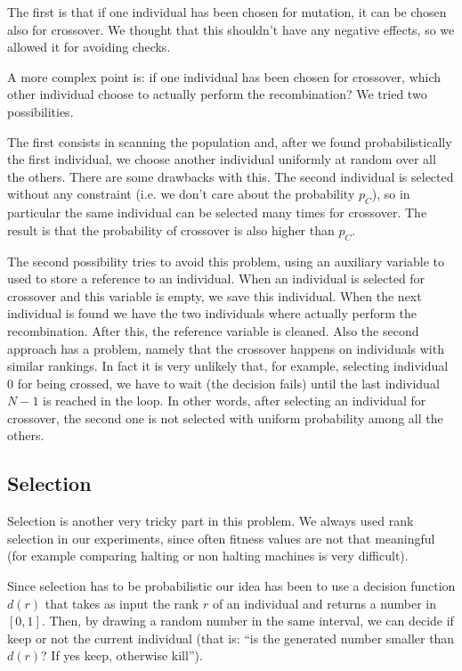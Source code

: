 \documentclass{report}
\begin{document}
The first is that if one individual has been chosen for mutation, it can be chosen also for crossover. We thought that this shouldn't have any negative effects, so we allowed it for avoiding checks.

A more complex point is: if one individual has been chosen for crossover, which other individual choose to actually perform the recombination? We tried two possibilities.

The first consists in scanning the population and, after we found probabilistically the first individual, we choose another individual uniformly at random over all the others. There are some drawbacks with this. The second individual is selected without any constraint (i.e. we don't care about the probability $p_C$), so in particular the same individual can be selected many times for crossover. The result is that the probability of crossover is also higher than $p_C$.

The second possibility tries to avoid this problem, using an auxiliary variable to used to store a reference to an individual. When an individual is selected for crossover and this variable is empty, we save this individual. When the next individual is found we have the two individuals where actually perform the recombination. After this, the reference variable is cleaned. Also the second approach has a problem, namely that the crossover happens on individuals with similar rankings. In fact it is very unlikely that, for example, selecting individual 0 for being crossed, we have to wait (the decision fails) until the last individual $N-1$ is reached in the loop. In other words, after selecting an individual for crossover, the second one is not selected with uniform probability among all the others.

\subsection{Selection}

Selection is another very tricky part in this problem. We always used rank selection in our experiments, since often fitness values are not that meaningful (for example comparing halting or non halting machines is very difficult).

Since selection has to be probabilistic our idea has been to use a decision function $d(r)$ that takes as input the rank $r$ of an individual and returns a number in $[0,1]$. Then, by drawing a random number in the same interval, we can decide if keep or not the current individual (that is: ``is the generated number smaller than $d(r)$? If yes keep, otherwise kill'').
\end{document}
